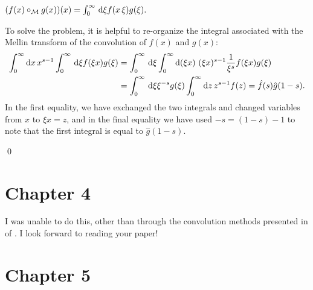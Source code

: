 \(
    (f(x) \circ_{\mathcal{M}} g(x))(x)
    =
    \int_0^\infty\,\dd\xi f(x\,\xi) g(\xi)
    .
\)


To solve the problem, it is helpful to re-organize the integral associated with the Mellin transform of the convolution of \(f(x)\) and \(g(x)\):
\begin{align}
    \int_0^\infty \dd x\, x^{s-1}
    \int_0^\infty \, \dd \xi
    f(\xi x) g(\xi)
    &=
    \int_0^\infty \, \dd \xi
    \int_0^\infty \dd (\xi x)\, (\xi x)^{s-1}
    \frac{1}{\xi^s}
    f(\xi x) g(\xi)
    \\
    \notag
    &=
    \int_0^\infty \, \dd \xi
    \xi^{-s}
    g(\xi)
    \int_0^\infty \dd z\, z^{s-1}
    f(z)
    =
    \hat{f}(s) \hat{g}(1-s)
    .
\end{align}
In the first equality, we have exchanged the two integrals and changed variables from \(x\) to \(\xi x = z\), and in the final equality we have used \(-s = (1-s) - 1\) to note that the first integral is equal to \(\hat{g}(1-s)\).

\qed{}



\section*{Chapter 4}





I was unable to do this, other than through the convolution methods presented in  of .
%
I look forward to reading your paper!



\section*{Chapter 5}

